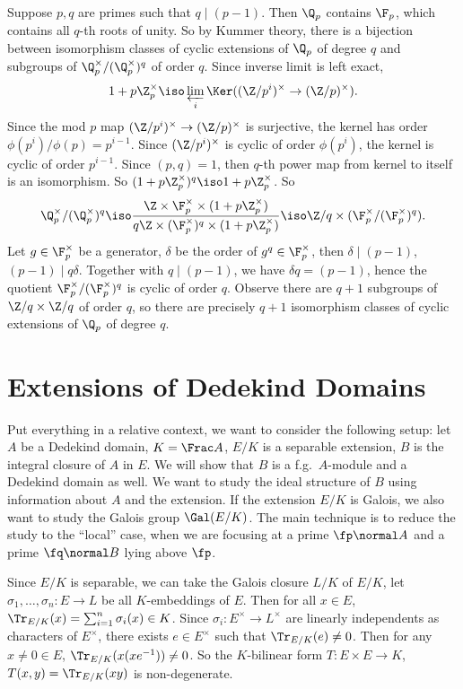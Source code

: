 \documentclass[11pt]{amsart}
\begin{document}
Suppose $p, q$ are primes such that $q \mid (p-1)$.  Then $\Q_p$ contains
$\F_p$, which contains all $q$-th roots of unity.  So by Kummer theory, there is a
bijection between isomorphism classes of cyclic extensions of $\Q_p$ of degree
$q$ and subgroups of $\Q_p^{\times}\slash (\Q_p^{\times})^{q}$ of order $q$.  Since
inverse limit is left exact,
\[
  1 + p\Z_p^{\times} \iso \varprojlim_i \Ker((\Z/p^i)^{\times} \to
  (\Z/p)^{\times}).
\]
Since the mod $p$ map $(\Z/p^i)^{\times} \to (\Z/p)^{\times}$ is surjective, the
kernel has order $\phi(p^i)/\phi(p) = p^{i-1}$.  Since $(\Z/p^i)^{\times}$ is
cyclic of order $\phi(p^i)$, the kernel is cyclic of order $p^{i-1}$.  Since
$(p,q) = 1$, then $q$-th power map from kernel to itself is an isomorphism.  So
$(1 + p\Z_p^{\times})^q \iso 1 + p\Z_p^{\times}$.  So
\[
    \Q_p^{\times}\slash (\Q_p^{\times})^q \iso
    \frac{\Z \times \F_p^{\times} \times (1 + p\Z_p^{\times})}{q\Z \times
        (\F_p^{\times})^q \times (1 + p\Z_p^{\times})} 
    \iso \Z\slash q \times (\F_p^{\times}\slash (\F_p^{\times})^q).
\]
Let $g \in \F_p^{\times}$ be a generator, $\delta$ be the order of $g^q \in
\F_p^{\times}$, then $\delta \mid (p-1)$, $(p-1) \mid q\delta$.  Together with
$q \mid (p-1)$, we have $\delta q = (p-1)$, hence the quotient
$\F_p^{\times}\slash (\F_p^{\times})^q$ is cyclic of order $q$.  Observe there are
$q+1$ subgroups of $\Z\slash q \times \Z\slash q$ of order $q$, so there are
precisely $q+1$ isomorphism classes of cyclic extensions of $\Q_p$ of degree
$q$.

\section{Extensions of Dedekind Domains}

Put everything in a relative context, we want to consider the following setup:
let $A$ be a Dedekind domain, $K = \Frac A$, $E/K$ is a separable extension, $B$
is the integral closure of $A$ in $E$.  We will show that $B$ is a
f.g.~$A$-module and a Dedekind domain as well.  We want to study the ideal
structure of $B$ using information about $A$ and the extension.
If the extension $E/K$ is Galois, we also want to study the Galois group
$\Gal(E/K)$.  The main technique is to reduce the study to the ``local'' case,
when we are focusing at a prime $\fp \normal A$ and a prime $\fq \normal B$
lying above $\fp$.

\medskip

Since $E/K$ is separable, we can take the Galois closure $L/K$ of $E/K$, let
$\sigma_1, \ldots, \sigma_n : E \to L$ be all $K$-embeddings of $E$. Then
for all $x \in E$, $\Tr_{E/K}(x) = \sum_{i=1}^{n} \sigma_i(x) \in K$.  Since
$\sigma_i : E^{\times} \to L^{\times}$ are linearly independents as characters
of $E^{\times}$, there exists $e \in E^{\times}$ such that $\Tr_{E/K}(e) \neq
0$.  Then for any $x \neq 0 \in E$, $\Tr_{E/K}(x(xe^{-1})) \neq 0$.  So the
$K$-bilinear form $T : E \times E \to K$, $T(x,y) = \Tr_{E/K}(xy)$ is
non-degenerate.
\end{document}
